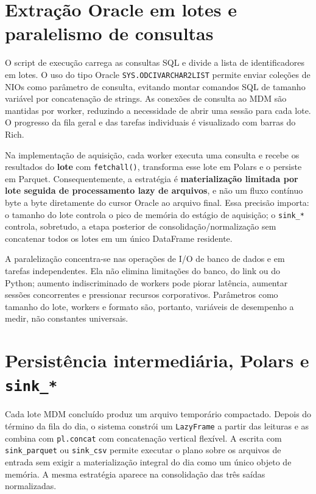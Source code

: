 \section{Extração Oracle em lotes e paralelismo de consultas}\label{extrauxe7uxe3o-oracle-em-lotes-e-paralelismo-de-consultas}

O script de execução carrega as consultas SQL e divide a lista de identificadores em lotes. O uso do tipo Oracle \texttt{SYS.ODCIVARCHAR2LIST} permite enviar coleções de NIOs como parâmetro de consulta, evitando montar comandos SQL de tamanho variável por concatenação de strings. As conexões de consulta ao MDM são mantidas por worker, reduzindo a necessidade de abrir uma sessão para cada lote. O progresso da fila geral e das tarefas individuais é visualizado com barras do Rich.

Na implementação de aquisição, cada worker executa uma consulta e recebe os resultados do \textbf{lote} com \texttt{fetchall()}, transforma esse lote em Polars e o persiste em Parquet. Consequentemente, a estratégia é \textbf{materialização limitada por lote seguida de processamento lazy de arquivos}, e não um fluxo contínuo byte a byte diretamente do cursor Oracle ao arquivo final. Essa precisão importa: o tamanho do lote controla o pico de memória do estágio de aquisição; o \texttt{sink\_*} controla, sobretudo, a etapa posterior de consolidação/normalização sem concatenar todos os lotes em um único DataFrame residente.

A paralelização concentra-se nas operações de I/O de banco de dados e em tarefas independentes. Ela não elimina limitações do banco, do link ou do Python; aumento indiscriminado de workers pode piorar latência, aumentar sessões concorrentes e pressionar recursos corporativos. Parâmetros como tamanho do lote, workers e formato são, portanto, variáveis de desempenho a medir, não constantes universais.

\section{\texorpdfstring{Persistência intermediária, Polars e \texttt{sink\_*}}{Persistência intermediária, Polars e sink\_*}}\label{persistuxeancia-intermediuxe1ria-polars-e-sink_}

Cada lote MDM concluído produz um arquivo temporário compactado. Depois do término da fila do dia, o sistema constrói um \texttt{LazyFrame} a partir das leituras  e as combina com \texttt{pl.concat} com concatenação vertical flexível. A escrita com \texttt{sink\_parquet} ou \texttt{sink\_csv} permite executar o plano sobre os arquivos de entrada sem exigir a materialização integral do dia como um único objeto de memória. A mesma estratégia aparece na consolidação das três saídas normalizadas.

